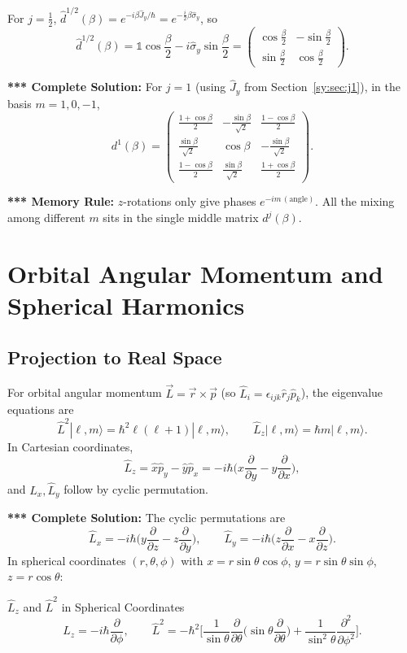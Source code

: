 \documentclass[11pt,a4paper]{article}
\begin{document}
For $j=\tfrac12$, $\hat d^{1/2}(\beta)=e^{-i\beta\hat J_y/\hbar}=e^{-\frac i2\beta\hat\sigma_y}$, so
\[
\hat d^{1/2}(\beta)=\mathbb 1\cos\frac\beta2-i\hat\sigma_y\sin\frac\beta2=\begin{pmatrix}\cos\frac\beta2&-\sin\frac\beta2\\ \sin\frac\beta2&\cos\frac\beta2\end{pmatrix}.
\]

\textbf{*** Complete Solution:} For $j=1$ (using $\hat J_y$ from Section~\ref{sy:sec:j1}), in the basis $m=1,0,-1$,
\[
d^1(\beta)=\begin{pmatrix}\frac{1+\cos\beta}2&-\frac{\sin\beta}{\sqrt2}&\frac{1-\cos\beta}2\\[2pt]\frac{\sin\beta}{\sqrt2}&\cos\beta&-\frac{\sin\beta}{\sqrt2}\\[2pt]\frac{1-\cos\beta}2&\frac{\sin\beta}{\sqrt2}&\frac{1+\cos\beta}2\end{pmatrix}.
\]

\textbf{*** Memory Rule:} $z$-rotations only give phases $e^{-im\,(\text{angle})}$. All the mixing among different $m$ sits in the single middle matrix $d^j(\beta)$.

\section{Orbital Angular Momentum and Spherical Harmonics}
\label{sy:sec:orb}

\subsection{Projection to Real Space}
For orbital angular momentum $\vec L=\vec r\times\vec p$ (so $\hat L_i=\epsilon_{ijk}\hat r_j\hat p_k$), the eigenvalue equations are
\[
\hat L^2|\ell,m\rangle=\hbar^2\ell(\ell+1)|\ell,m\rangle,\qquad \hat L_z|\ell,m\rangle=\hbar m|\ell,m\rangle .
\]
In Cartesian coordinates,
\[
\hat L_z=\hat x\hat p_y-\hat y\hat p_x=-i\hbar\Big(x\frac\partial{\partial y}-y\frac\partial{\partial x}\Big),
\]
and $\hat L_x,\hat L_y$ follow by cyclic permutation.

\textbf{*** Complete Solution:} The cyclic permutations are
\[
\hat L_x=-i\hbar\Big(y\frac\partial{\partial z}-z\frac\partial{\partial y}\Big),\qquad \hat L_y=-i\hbar\Big(z\frac\partial{\partial x}-x\frac\partial{\partial z}\Big).
\]
In spherical coordinates $(r,\theta,\phi)$ with $x=r\sin\theta\cos\phi$, $y=r\sin\theta\sin\phi$, $z=r\cos\theta$:
\begin{thm}{$\hat L_z$ and $\hat L^2$ in Spherical Coordinates}
\[
\hat L_z=-i\hbar\frac{\partial}{\partial\phi},\qquad
\hat L^2=-\hbar^2\Big[\frac1{\sin\theta}\frac\partial{\partial\theta}\Big(\sin\theta\frac\partial{\partial\theta}\Big)+\frac1{\sin^2\theta}\frac{\partial^2}{\partial\phi^2}\Big].
\]
\end{thm}
\end{document}

